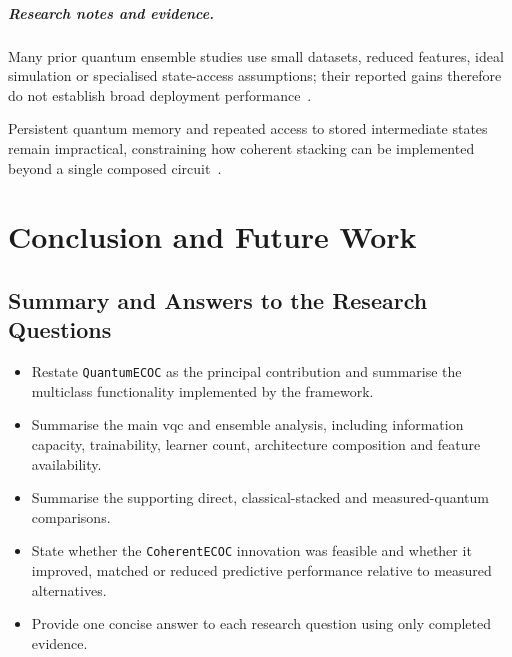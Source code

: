 \documentclass[]{UCD_CS_MSc_AAI_Report}
\newcommand{\limitation}[1]{{\color{orange}#1}}
\newcommand{\researchnotes}{\paragraph{Research notes and evidence.}}
\begin{document}
\researchnotes
\begin{itemize}
    \limitation{\item Many prior quantum ensemble studies use small datasets, reduced features, ideal simulation or specialised state-access assumptions; their reported gains therefore do not establish broad deployment performance~\cite{vasan_exploring_2025,tolotti_weighted_2025}.}
    \limitation{\item Persistent quantum memory and repeated access to stored intermediate states remain impractical, constraining how coherent stacking can be implemented beyond a single composed circuit~\cite{resch_quantum_2019}.}
\end{itemize}


\chapter{Conclusion and Future Work}
\label{chap:conclusion}

\section{Summary and Answers to the Research Questions}
\label{sec:conclusion-summary}
\begin{itemize}
    \item Restate \texttt{QuantumECOC} as the principal contribution and summarise the multiclass functionality implemented by the framework.
    \item Summarise the main \ac{vqc} and ensemble analysis, including information capacity, trainability, learner count, architecture composition and feature availability.
    \item Summarise the supporting direct, classical-stacked and measured-quantum comparisons.
    \item State whether the \texttt{CoherentECOC} innovation was feasible and whether it improved, matched or reduced predictive performance relative to measured alternatives.
    \item Provide one concise answer to each research question using only completed evidence.
\end{itemize}
\end{document}
